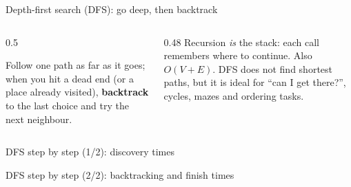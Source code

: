\documentclass[aspectratio=169,10pt]{beamer}
\newcommand{\gA}{white}\newcommand{\gB}{white}\newcommand{\gC}{white}\newcommand{\gD}{white}\newcommand{\gE}{white}\newcommand{\gF}{white}
\newcommand{\campus}[1]{%
  \coordinate (pg) at (0,0); \coordinate (pl) at (2.6,1.5); \coordinate (pc) at (2.6,-1.5);
  \coordinate (pb) at (5.6,1.5); \coordinate (pd) at (5.6,-1.5); \coordinate (py) at (8.2,0);
  \ifnum#1=1
    \draw[tdInk!60] (pg) -- node[wl] {4} (pl); \draw[tdInk!60] (pg) -- node[wl] {2} (pc);
    \draw[tdInk!60] (pl) -- node[wl] {5} (pb); \draw[tdInk!60] (pl) -- node[wl,pos=0.3] {6} (pd);
    \draw[tdInk!60] (pc) -- node[wl] {3} (pd); \draw[tdInk!60] (pb) -- node[wl] {6} (py); \draw[tdInk!60] (pd) -- node[wl] {2} (py);
  \else
    \foreach \u/\v in {pg/pl,pg/pc,pl/pb,pl/pd,pc/pd,pb/py,pd/py}{\draw[tdInk!60] (\u) -- (\v);}
  \fi
  \node[gn,fill=\gA] (gate) at (pg) {Gate}; \node[gn,fill=\gB] (lib) at (pl) {Lib}; \node[gn,fill=\gC] (cafe) at (pc) {Cafe};
  \node[gn,fill=\gD] (lab) at (pb) {Lab}; \node[gn,fill=\gE] (dorm) at (pd) {Dorm}; \node[gn,fill=\gF] (gym) at (py) {Gym};}
\newcommand{\badge}[3]{\node[circle,fill=#3,text=white,minimum size=4.2mm,inner sep=0pt,font=\scriptsize\bfseries] at ($(#1)+(0.55,0.45)$) {#2};}
\begin{document}
\begin{frame}{Depth-first search (DFS): go deep, then backtrack}
\begin{columns}[T]
\begin{column}{0.5\textwidth}
\begin{sfig}[0.5]
\end{sfig}
{\small Follow one path as far as it goes; when you hit a dead end (or a place already visited), \textbf{backtrack} to the last choice and try the next neighbour.}
\end{column}
\begin{column}{0.48\textwidth}
\vspace{2mm}
\vspace{2mm}
{\small
Recursion \emph{is} the stack: each call remembers where to continue. Also $O(V+E)$. DFS does not find shortest paths, but it is ideal for ``can I get there?'', cycles, mazes and ordering tasks.}
\end{column}
\end{columns}
\end{frame}

\begin{frame}{DFS step by step (1/2): discovery times}

\end{frame}

\begin{frame}{DFS step by step (2/2): backtracking and finish times}

\end{frame}
\end{document}
